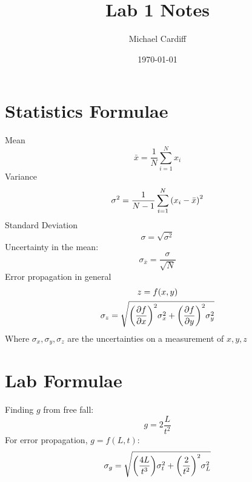\documentclass[12pt]{article}
\title{\vspace{-3em}Lab 1 Notes}
\author{Michael Cardiff}
\date{\today}
\begin{document}
\maketitle
\section{Statistics Formulae}
Mean
\begin{equation}
  \bar{x}=\frac{1}{N}\sum_{i=1}^Nx_i
\end{equation}
Variance
\begin{equation}
  \sigma^2=\frac{1}{N-1}\sum_{i=1}^N\qty(x_i-\bar{x})^2
\end{equation}
Standard Deviation
\begin{equation}
  \sigma=\sqrt{\sigma^2}
\end{equation}
Uncertainty in the mean:
\begin{equation}
  \sigma_{\bar{x}}=\frac{\sigma}{\sqrt{N}}
\end{equation}
Error propagation in general
\begin{gather*}
  z=f(x,y)\\
  \sigma_z=\sqrt{\qty(\pdv{f}{x})^2\sigma_x^2+\qty(\pdv{f}{y})^2\sigma_y^2}
\end{gather*}
Where $\sigma_x,\sigma_y,\sigma_z$ are the uncertainties on a measurement of $x,y,z$
\section{Lab Formulae}
Finding $g$ from free fall:
\begin{equation}
  g=2\frac{L}{t^2}
\end{equation}
For error propagation, $g=f(L,t)$:
\begin{equation}
  \sigma_g=\sqrt{\qty(\frac{4L}{t^3})\sigma_t^2+\qty(\frac{2}{t^2})^2\sigma_L^2}
\end{equation}
\end{document}
